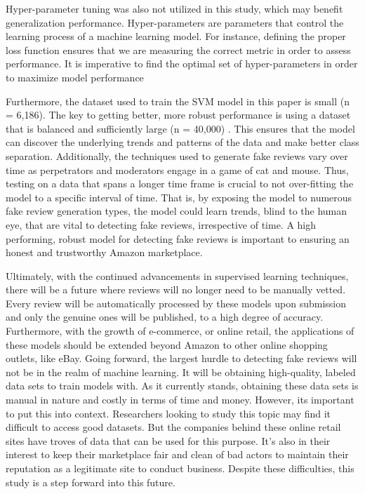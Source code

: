 \documentclass[12pt]{article}
\begin{document}
Hyper-parameter tuning was also not utilized in this study, which may benefit generalization performance. Hyper-parameters are parameters that control the learning process of a machine learning model. For instance, defining the proper loss function ensures that we are measuring the correct metric in order to assess performance. It is imperative to find the optimal set of hyper-parameters in order to maximize model performance

Furthermore, the dataset used to train the SVM model in this paper is small (n = 6,186). The key to getting better, more robust performance is using a dataset that is balanced and sufficiently large (n = 40,000) \citep{Salminen2022}. This ensures that the model can discover the underlying trends and patterns of the data and make better class separation. Additionally, the techniques used to generate fake reviews vary over time as perpetrators and moderators engage in a game of cat and mouse. Thus, testing on a data that spans a longer time frame is crucial to not over-fitting the model to a specific interval of time. That is, by exposing the model to numerous fake review generation types, the model could learn trends, blind to the human eye, that are vital to detecting fake reviews, irrespective of time. A high performing, robust model for detecting fake reviews is important to ensuring an honest and trustworthy Amazon marketplace.

Ultimately, with the continued advancements in supervised learning techniques, there will be a future where reviews will no longer need to be manually vetted. Every review will be automatically processed by these models upon submission and only the genuine ones will be published, to a high degree of accuracy. Furthermore, with the growth of e-commerce, or online retail, the applications of these models should be extended beyond Amazon to other online shopping outlets, like eBay. Going forward, the largest hurdle to detecting fake reviews will not be in the realm of machine learning. It will be obtaining high-quality, labeled data sets to train models with. As it currently stands, obtaining these data sets is manual in nature and costly in terms of time and money. However, its important to put this into context. Researchers looking to study this topic may find it difficult to access good datasets. But the companies behind these online retail sites have troves of data that can be used for this purpose. It's also in their interest to keep their marketplace fair and clean of bad actors to maintain their reputation as a legitimate site to conduct business. Despite these difficulties, this study is a step forward into this future.



\end{document}
